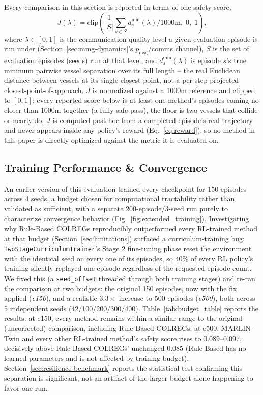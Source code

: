 \documentclass[journal,twocolumn,10pt]{IEEEtran}
\begin{document}
Every comparison in this section is reported in terms of one safety score,
\begin{equation}
J(\lambda) = \text{clip}\!\left(\frac{1}{|S|}\sum_{s \in S} d^{\min}_s(\lambda) \Big/ 1000\text{m},\; 0,\; 1\right),
\label{eq:safety_score}
\end{equation}
where $\lambda \in [0,1]$ is the communication-quality level a given evaluation episode is run under (Section~\ref{sec:mmg-dynamics}'s $p_{\text{msg}}$/comms channel), $S$ is the set of evaluation episodes (seeds) run at that level, and $d^{\min}_s(\lambda)$ is episode $s$'s true minimum pairwise vessel separation over its full length -- the real Euclidean distance between vessels at its single closest point, not a per-step projected closest-point-of-approach. $J$ is normalized against a 1000m reference and clipped to $[0,1]$; every reported score below is at least one method's episodes coming no closer than 1000m together (a fully safe pass), the floor is two vessels that collide or nearly do. $J$ is computed post-hoc from a completed episode's real trajectory and never appears inside any policy's reward (Eq.~\ref{eq:reward}), so no method in this paper is directly optimized against the metric it is evaluated on.

\subsection{Training Performance \& Convergence}
\label{sec:training-budget}
An earlier version of this evaluation trained every checkpoint for 150 episodes across 4 seeds, a budget chosen for computational tractability rather than validated as sufficient, with a separate 200-episode/3-seed run purely to characterize convergence behavior (Fig.~\ref{fig:extended_training}). Investigating why Rule-Based COLREGs reproducibly outperformed every RL-trained method at that budget (Section~\ref{sec:limitations}) surfaced a curriculum-training bug: \texttt{TwoStageCurriculumTrainer}'s Stage 2 fine-tuning phase reset the environment with the identical seed on every one of its episodes, so 40\% of every RL policy's training silently replayed one episode regardless of the requested episode count. We fixed this (a \texttt{seed\_offset} threaded through both training stages) and re-ran the comparison at two budgets: the original 150 episodes, now with the fix applied (\emph{e150}), and a realistic $3.3\times$ increase to 500 episodes (\emph{e500}), both across 5 independent seeds (42/100/200/300/400). Table~\ref{tab:budget_table} reports the results: at e150, every method remains within a similar range to the original (uncorrected) comparison, including Rule-Based COLREGs; at e500, MARLIN-Twin and every other RL-trained method's safety score rises to $0.089$--$0.097$, decisively above Rule-Based COLREGs' unchanged $0.085$ (Rule-Based has no learned parameters and is not affected by training budget). Section~\ref{sec:resilience-benchmark} reports the statistical test confirming this separation is significant, not an artifact of the larger budget alone happening to favor one run.
\end{document}
